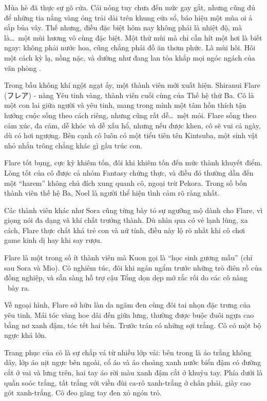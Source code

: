 \documentclass[../main.tex]{subfiles}
\begin{document}
Mùa hè đã thực sự gõ cửa. Cái nóng tuy chưa đến mức gay gắt, nhưng cũng đủ để những tia nắng vàng óng trải dài trên khung cửa sổ, báo hiệu một mùa oi ả sắp bủa vây. Thế nhưng, điều đặc biệt hôm nay không phải là nhiệt độ, mà là\dots\ một mùi hương vô cùng đặc biệt. Một thứ mùi mà chỉ cần hít một hơi là biết ngay: không phải nước hoa, cũng chẳng phải đồ ăn thơm phức. Là mùi hôi. Hôi một cách kỳ lạ, nồng nặc, và dường như đang lan tỏa khắp mọi ngóc ngách của văn phòng \hll.

\chrint


Trong bầu không khí ngột ngạt ấy, một thành viên mới xuất hiện. Shiranui Flare (フレア) - nàng Yêu tinh vàng, thành viên cuối cùng của Thế hệ thứ Ba. Cô là một con lai giữa người và yêu tinh, mang trong mình một tâm hồn thích tận hưởng cuộc sống theo cách riêng, nhưng cũng rất dễ\dots\ mệt mỏi. Flare sống theo cảm xúc, đa cảm, dễ khóc và dễ xấu hổ, nhưng nếu được khen, cô sẽ vui cả ngày, dù có hơi ngượng. Bên cạnh cô luôn có một tiểu tiên tên Kintsuba, một sinh vật nhỏ nhắn trông chẳng khác gì gấu trúc con.

Flare tốt bụng, cực kỳ khiêm tốn, đôi khi khiêm tốn đến mức thành khuyết điểm. Lòng tốt của cô được cả nhóm Fantasy chứng thực, và điều đó thường dẫn đến một ``harem'' không chủ đích xung quanh cô, ngoại trừ Pekora. Trong số bốn thành viên thế hệ Ba, Noel là người thể hiện tình cảm rõ ràng nhất.

Các thành viên khác như Sora cũng từng bày tỏ sự ngưỡng mộ dành cho Flare, vì giọng nói đa dạng và khí chất trưởng thành. Dù nhìn qua có vẻ lạnh lùng, xa cách, Flare thực chất khá trẻ con và nữ tính, điều này lộ rõ nhất khi cô chơi game kinh dị hay khi say rượu.

Flare là một trong số ít thành viên mà Kuon gọi là ``học sinh gương mẫu'' (chỉ sau Sora và Mio). Cô nghiêm túc, đôi khi ngán ngẩm trước những trò điên rồ của đồng nghiệp, và sẵn sàng hỗ trợ cậu Tổng dọn dẹp mớ rắc rối do các cô nàng \hll\ bày ra.

Về ngoại hình, Flare sở hữu làn da ngăm đen cùng đôi tai nhọn đặc trưng của yêu tinh. Mái tóc vàng hoe dài đến giữa lưng, thường được buộc đuôi ngựa cao bằng nơ xanh đậm, tóc tết hai bên. Trước trán có những sợi trắng. Cô có một bộ ngực khá lớn.

Trang phục của cô là sự chắp vá từ nhiều lớp vải: bên trong là áo trắng không dây, lớp áo nịt ngực bên ngoài, cổ áo và áo choàng xanh nước biển đậm có đường cắt ở vai và lưng trên, hai tay áo rời màu xanh đậm cắt ở khuỷu tay. Phía dưới là quần soóc trắng, tất trắng với viền đùi ca-rô xanh-trắng ở chân phải, giày cao gót xanh-trắng. Cô đeo găng tay đen xỏ ngón trỏ.
\end{document}
